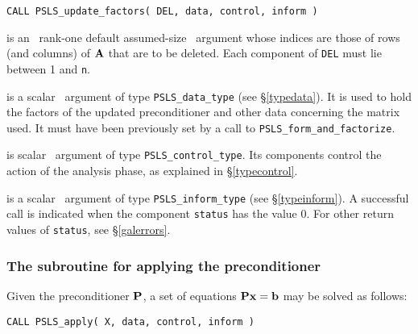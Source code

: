 \documentclass{galahad}
\newcommand{\packagename}{PSLS}
\begin{document}
\hskip0.5in
{\tt CALL \packagename\_update\_factors( DEL, data, control, inform )}

\begin{description}
 is an \intentin\ rank-one default assumed-size 
\integer\ argument whose indices are those of rows (and columns) of ${\mathbf{A}}$
that are to be deleted. Each component of {\tt DEL} must lie between 1 and 
{\tt n}.

 is a scalar \intentinout\ argument of type
{\tt \packagename\_data\_type}
(see \S\ref{typedata}). It is used to hold the factors of the 
updated preconditioner and other data concerning the matrix used.
It must have been previously set by a call to
{\tt \packagename\_form\_and\_factorize}.

 is scalar \intentin\ argument of type
{\tt \packagename\_control\_type}. Its components control the action
of the analysis phase, as explained in
\S\ref{typecontrol}.

 is a scalar \intentinout\ argument of type
{\tt \packagename\_inform\_type}
(see \S\ref{typeinform}).
A successful call is indicated when the  component {\tt status} has the value 0.
For other return values of {\tt status}, see \S\ref{galerrors}.

\end{description}


\subsubsection{The subroutine for applying the preconditioner}
\label{solve}
Given the preconditioner ${\mathbf{P}}$, a set of equations 
${\mathbf{P}} {\mathbf{x}} = {\mathbf{b}}$ may be solved as follows:

\hskip0.5in
{\tt CALL \packagename\_apply( X, data, control, inform )}
\end{document}

